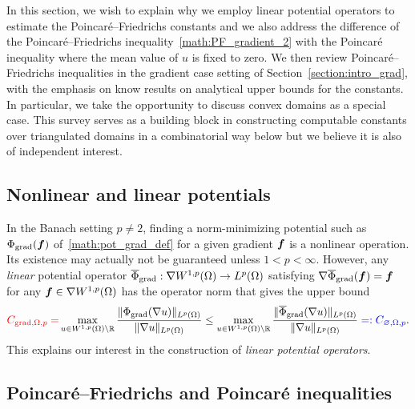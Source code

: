 \documentclass[10pt,a4paper]{article}
\newcommand\cye[1]{%
\protect\leavevmode
\begingroup
    \color{blue}%
    #1%
\endgroup
}
\newcommand{\mwl}[1]{{\color{red}#1}}
\begin{document}
In this section, we wish to explain why we employ linear potential operators to estimate the Poincar\'e--Friedrichs constants and we also address the difference of the Poincar\'e--Friedrichs inequality~\eqref{math:PF_gradient_2} with the Poincar\'e inequality where the mean value of $u$ is fixed to zero. We then review Poincar\'e--Friedrichs inequalities in the gradient case setting of Section~\ref{section:intro_grad}, with the emphasis on know results on analytical upper bounds for the constants. In particular, we take the opportunity to discuss convex domains as a special case. This survey serves as a building block in constructing computable constants over triangulated domains in a combinatorial way below but we believe it is also of independent interest.


\subsection{Nonlinear and linear potentials}

In the Banach setting $p \neq 2$, finding a norm-minimizing potential such as $\Phi_{\operatorname{grad}}( \bm{f} )$ of~\eqref{math:pot_grad_def} for a given gradient $\bm{f}$ is a nonlinear operation. Its existence may actually not be guaranteed unless $1 < p < \infty$. 
However, any \textit{linear} potential operator $\overline\Phi_{\operatorname{grad}} : \nabla W^{1,p}(\Omega) \rightarrow L^{p}(\Omega)$
satisfying $\nabla \overline\Phi_{\operatorname{grad}}( \bm{f} ) = \bm{f}$ for any $\bm{f} \in \nabla W^{1,p}(\Omega)$ has the operator norm that \cye{gives} the upper bound 
\begin{align}\label{math:PF_P}
    \mwl{C_{\grad,\Omega,p} = } 
    \max\limits_{ u \in W^{1,p}(\Omega) \setminus \bbR } 
    \frac{ \| \Phi_{\grad}(\nabla u) \|_{L^{p}(\Omega)} }{ \| \nabla u \|_{\fooL^{p}(\Omega)} }
    \leq 
    \max\limits_{ u \in W^{1,p}(\Omega) \setminus \bbR } 
    \frac{ \| \overline\Phi_{\grad}(\nabla u) \|_{L^{p}(\Omega)} }{ \| \nabla u \|_{\fooL^{p}(\Omega)} } \cye{=: C_{\varnothing,\Omega,p}}
    .
\end{align}
This explains our interest in the construction of {\em linear potential operators}.

\subsection{Poincar\'e--Friedrichs and Poincar\'e inequalities}
\end{document}
